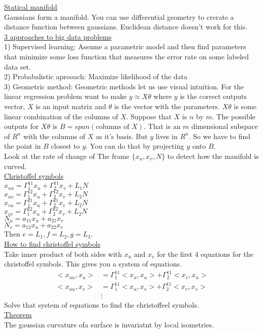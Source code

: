 \documentclass[12pt,letterpaper]{hmcpset}
\begin{document}
\underline{Statical manifold} \\
Gaussians form a manifold. You can use differential geometry to crerate a
distance function between gaussians. Euclidean distance doesn't work for this.
\\
\underline{3 approaches to big data problems} \\
1) Supervised learning: Assume a parametric model and then find parameters that
minimize some loss function that measures the error rate on some labeled data set. \\
2) Probabalistic aprooach: Maximize likelihood of the data \\
3) Geometric method: Geometric methods let us use visual intuition. For the
linear regression problem want to make $y \approx X\theta$ where $y$ is the correct outputs
vector, $X$ is an input matrix and $\theta$ is the vector with the parameters. $X\theta$
is some linear combination of the columns of $X$. Suppose that $X$ is $n$ by
$m$. The possible outputs for $X\theta$ is $B = span(\text{columns of }X)$. That is an
$m$ dimensional subspace of $R^n$ with the columns of $X$ as it's basis. But $y$ lives in $R^n$. So we have to find the point in
$B$ closest to $y$. You can do that by projecting $y$ onto $B$. \\
Look at the rate of change of The frame $\{x_u, x_v, N\}$ to detect how the
manifold is curved. \\
\underline{Christoffel symbols} \\
$x_{uu} = \Gamma^{11}_1x_u + \Gamma^{11}_2x_v + L_1N$ \\
$x_{uv} = \Gamma^{12}_1x_u + \Gamma^{12}_2x_v + L_2N$ \\
$x_{vu} = \Gamma^{21}_1x_u + \Gamma^{21}_2x_v + L_2N$ \\
$x_{vv} = \Gamma^{22}_1x_u + \Gamma^{22}_2x_v + L_2N$ \\
$N_u = a_{11}x_u + a_{21}x_v$ \\
$N_v = a_{12}x_u + a_{22}x_v$ \\
Then $e=L_1, f=L_2, g=L_3$. \\
\underline{How to find christoffel symbols} \\
Take inner product of both sides with $x_u$ and $x_v$ for the first 4 equations
for the christoffel symbols. This gives you a system of equations.
\begin{align*}
  <x_{uu}, x_u> &= \Gamma^{11}_1<x_u, x_u> + \Gamma^{11}_2<x_v, x_u> \\
  <x_{uu}, x_v> &= \Gamma^{11}_1<x_u, x_v> + \Gamma^{11}_2<x_v, x_v> \\
  &\vdots
\end{align*}
Solve that system of equations to find the christoffeel symbols.\\
\underline{Theorem} \\
The gaussian curvature ofa surface is invariatnt by local isometries.
\end{document}
